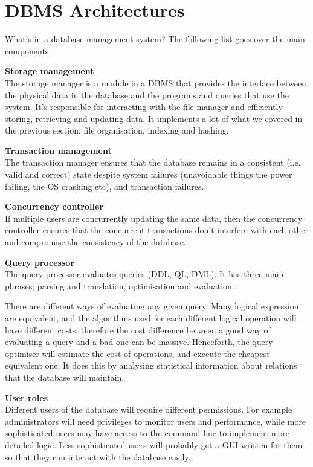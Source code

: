 \section{DBMS Architectures}

What's in a database management system? The following list goes over the main
components:

\begin{description}
  \item \textbf{Storage management}\\
    The storage manager is a module in a DBMS that provides the interface
    between the physical data in the database and the programs and queries that
    use the system. It's responsible for interacting with the file manager and
    efficiently storing, retrieving and updating data. It implements a lot of
    what we covered in the previous section; file organisation, indexing and
    hashing.

  \item \textbf{Transaction management}\\
    The transaction manager ensures that the database remains in a consistent
    (i.e. valid and correct) state despite system failures (unavoidable things
    the power failing, the OS crashing etc), and transaction failures.

  \item \textbf{Concurrency controller}\\
    If multiple users are concurrently updating the same data, then the
    concurrency controller ensures that the concurrent transactions don't
    interfere with each other and compromise the consistency of the database.

  \item \textbf{Query processor}\\
    The query processor evaluates queries (DDL, QL, DML). It has three main
    phrases; parsing and translation, optimisation and evaluation.

    There are different ways of evaluating any given query. Many logical
    expression are equivalent, and the algorithms used for each different
    logical operation will have different costs, therefore the cost difference
    between a good way of evaluating a query and a bad one can be massive.
    Henceforth, the query optimiser will estimate the cost of operations, and
    execute the cheapest equivalent one. It does this by analysing statistical
    information about relations that the database will maintain,

  \item \textbf{User roles}\\
    Different users of the database will require different permissions. For
    example administrators will need privileges to monitor users and
    performance, while more sophisticated users may have access to the command
    line to implement more detailed logic. Less sophisticated users will
    probably get a GUI written for them so that they can interact with the
    database easily.

\end{description}

